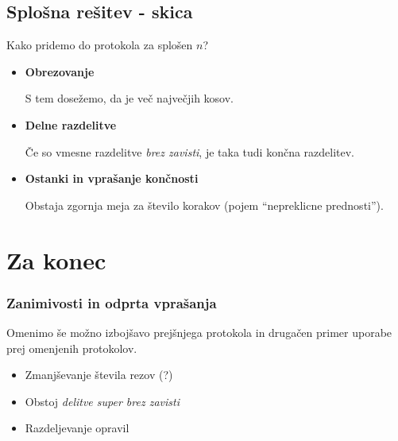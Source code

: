 \documentclass{beamer}
\begin{document}
\subsection{Splošna rešitev - skica}
\begin{frame}

Kako pridemo do protokola za splošen $n$?

\begin{itemize}

\item \textbf{Obrezovanje} 

S tem dosežemo, da je več največjih kosov.

\item \textbf{Delne razdelitve} 

Če so vmesne razdelitve {\em brez zavisti}, je taka tudi končna razdelitev.

\item \textbf{Ostanki in vprašanje končnosti} 

Obstaja zgornja meja za število korakov (pojem ``nepreklicne prednosti'').

\end{itemize}

\end{frame}

\section{Za konec}

\begin{frame}

\frametitle{Zanimivosti in odprta vprašanja}

Omenimo še možno izbojšavo prejšnjega protokola in drugačen primer uporabe prej omenjenih protokolov.

\begin{itemize}

\item Zmanjševanje števila rezov (?)

\item Obstoj {\em delitve super brez zavisti}

\item Razdeljevanje opravil

\end{itemize}

\end{frame}

\end{document}
